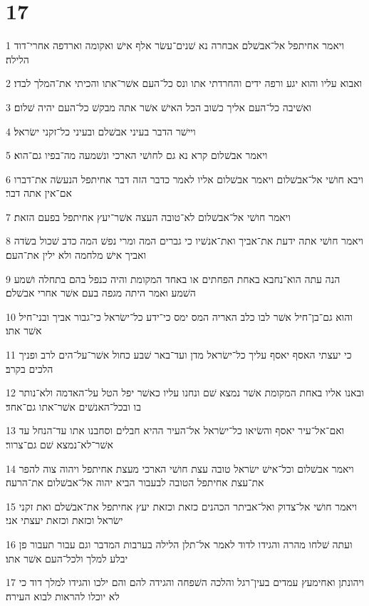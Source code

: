 \chapter{17}

\par 1 ויאמר אחיתפל אל־אבשׁלם אבחרה נא שׁנים־עשׂר אלף אישׁ ואקומה וארדפה אחרי־דוד הלילה׃
\par 2 ואבוא עליו והוא יגע ורפה ידים והחרדתי אתו ונס כל־העם אשׁר־אתו והכיתי את־המלך לבדו׃
\par 3 ואשׁיבה כל־העם אליך כשׁוב הכל האישׁ אשׁר אתה מבקשׁ כל־העם יהיה שׁלום׃
\par 4 ויישׁר הדבר בעיני אבשׁלם ובעיני כל־זקני ישׂראל׃
\par 5 ויאמר אבשׁלום קרא נא גם לחושׁי הארכי ונשׁמעה מה־בפיו גם־הוא׃
\par 6 ויבא חושׁי אל־אבשׁלום ויאמר אבשׁלום אליו לאמר כדבר הזה דבר אחיתפל הנעשׂה את־דברו אם־אין אתה דבר׃
\par 7 ויאמר חושׁי אל־אבשׁלום לא־טובה העצה אשׁר־יעץ אחיתפל בפעם הזאת׃
\par 8 ויאמר חושׁי אתה ידעת את־אביך ואת־אנשׁיו כי גברים המה ומרי נפשׁ המה כדב שׁכול בשׂדה ואביך אישׁ מלחמה ולא ילין את־העם׃
\par 9 הנה עתה הוא־נחבא באחת הפחתים או באחד המקומת והיה כנפל בהם בתחלה ושׁמע השׁמע ואמר היתה מגפה בעם אשׁר אחרי אבשׁלם׃
\par 10 והוא גם־בן־חיל אשׁר לבו כלב האריה המס ימס כי־ידע כל־ישׂראל כי־גבור אביך ובני־חיל אשׁר אתו׃
\par 11 כי יעצתי האסף יאסף עליך כל־ישׂראל מדן ועד־באר שׁבע כחול אשׁר־על־הים לרב ופניך הלכים בקרב׃
\par 12 ובאנו אליו באחת המקומת אשׁר נמצא שׁם ונחנו עליו כאשׁר יפל הטל על־האדמה ולא־נותר בו ובכל־האנשׁים אשׁר־אתו גם־אחד׃
\par 13 ואם־אל־עיר יאסף והשׂיאו כל־ישׂראל אל־העיר ההיא חבלים וסחבנו אתו עד־הנחל עד אשׁר־לא־נמצא שׁם גם־צרור׃
\par 14 ויאמר אבשׁלום וכל־אישׁ ישׂראל טובה עצת חושׁי הארכי מעצת אחיתפל ויהוה צוה להפר את־עצת אחיתפל הטובה לבעבור הביא יהוה אל־אבשׁלום את־הרעה׃
\par 15 ויאמר חושׁי אל־צדוק ואל־אביתר הכהנים כזאת וכזאת יעץ אחיתפל את־אבשׁלם ואת זקני ישׂראל וכזאת וכזאת יעצתי אני׃
\par 16 ועתה שׁלחו מהרה והגידו לדוד לאמר אל־תלן הלילה בערבות המדבר וגם עבור תעבור פן יבלע למלך ולכל־העם אשׁר אתו׃
\par 17 ויהונתן ואחימעץ עמדים בעין־רגל והלכה השׁפחה והגידה להם והם ילכו והגידו למלך דוד כי לא יוכלו להראות לבוא העירה׃
